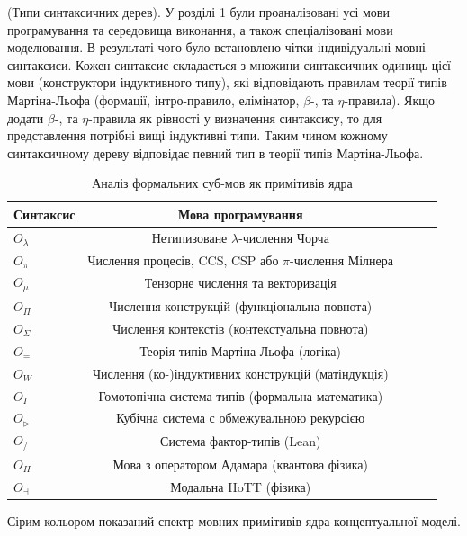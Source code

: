 \begin{definition} (Типи синтаксичних дерев).
У розділі 1 були проаналізовані усі мови програмування та середовища виконання,
а також спеціалізовані мови моделювання. В результаті чого було встановлено
чітки індивідуальні мовні синтаксиси. Кожен синтаксис складається з
множини синтаксичних одиниць цієї мови (конструктори індуктивного типу),
які відповідають правилам теорії типів Мартіна-Льофа (формації, інтро-правило,
елімінатор, $\beta$-, та $\eta$-правила). Якщо додати $\beta$-, та $\eta$-правила
як рівності у визначення синтаксису, то для представлення потрібні вищі індуктивні типи.
Таким чином кожному синтаксичному дереву відповідає певний тип в теорії типів Мартіна-Льофа.
\begin{table}
  \caption{Аналіз формальних суб-мов як примітивів ядра}
 \begin{tabular}{lcccc}
    \hline
       \textbf{Синтаксис} & \textbf{Мова програмування} \\
    \hline
    \rowcolor{LightGray}
       $O_\lambda$                     & Нетипизоване $\lambda$-числення Чорча \\
    \rowcolor{LightGray}
       $O_\pi$                         & Числення процесів, CCS, CSP або $\pi$-числення Мілнера\\
    \rowcolor{LightGray}
       $O_\mu$                         & Тензорне числення та векторизація \\
    \hline
    \rowcolor{LightGray}
       $O_\Pi$                         & Числення конструкцій (функціональна повнота) \\
    \rowcolor{LightGray}
       $O_\Sigma$                      & Числення контекстів (контекстуальна повнота) \\
    \rowcolor{LightGray}
       $O_=$                           & Теорія типів Мартіна-Льофа (логіка) \\
    \rowcolor{LightGray}
       $O_W$                           & Числення (ко-)індуктивних конструкцій (матіндукція) \\
    \rowcolor{LightGray}
       $O_{I}$                         & Гомотопічна система типів (формальна математика) \\
    \rowcolor{LightGray}
       $O_{\triangleright}$            & Кубічна система с обмежувальною рекурсією \\
      \hline
       $O_{/}$                         & Система фактор-типів (Lean) \\
       $O_{H}$                         & Мова з оператором Адамара (квантова фізика)\\
       $O_{\dashv}$                    & Модальна HoTT (фізика)\\
      \hline
  \end{tabular}
  \small Сірим кольором показаний спектр мовних примітивів ядра концептуальної моделі.
\end{table}
\end{definition}

